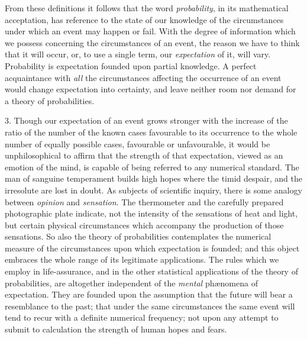 \documentclass[oneside]{book}
\begin{document}
From these definitions it follows that the word \textit{probability}, in
its mathematical acceptation, has reference to the state of our
knowledge of the circumstances under which an event may happen
or fail. With the degree of information which we possess
concerning the circumstances of an event, the reason we have to
think that it will occur, or, to use a single term, our \textit{expectation} of
it, will vary. Probability is expectation founded upon partial
knowledge. A perfect acquaintance with \textit{all} the circumstances
affecting the occurrence of an event would change expectation
into certainty, and leave neither room nor demand for a theory
of probabilities.

3. Though our expectation of an event grows stronger with
the increase of the ratio of the number of the known cases favourable
to its occurrence to the whole number of equally possible
cases, favourable or unfavourable, it would be unphilosophical
to affirm that the strength of that expectation, viewed as an
emotion of the mind, is capable of being referred to any numerical
standard. The man of sanguine temperament builds high hopes
where the timid despair, and the irresolute are lost in doubt.
As subjects of scientific inquiry, there is some analogy between
\textit{opinion} and \textit{sensation}. The thermometer and the carefully prepared
photographic plate indicate, not the intensity of the sensations
of heat and light, but certain physical circumstances
which accompany the production of those sensations. So also
the theory of probabilities contemplates the numerical measure
of the circumstances upon which expectation is founded; and this
object embraces the whole range of its legitimate applications.
The rules which we employ in life-assurance, and in the other
statistical applications of the theory of probabilities, are altogether
independent of the \textit{mental} ph{\ae}nomena of expectation. They are
founded upon the assumption that the future will bear a
resemblance to the past; that under the same circumstances the same
event will tend to recur with a definite numerical frequency; not
upon any attempt to submit to calculation the strength of human
hopes and fears.
\end{document}
